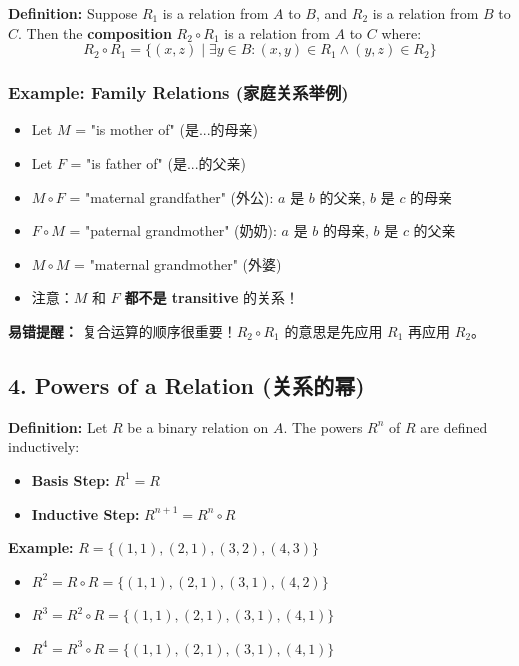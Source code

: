 \documentclass[10pt,a4paper,openany]{ctexbook}
\theoremstyle{definition}
\theoremstyle{remark}
\renewenvironment{quote}
  {\list{}{\leftmargin=1em\rightmargin=0pt\topsep=0.5pt\partopsep=0pt}\item[]}
  {\endlist}
\begin{document}
\textbf{Definition:} Suppose $R_1$ is a relation from $A$ to $B$, and $R_2$ is a relation from $B$ to $C$. Then the \textbf{composition} $R_2 \circ R_1$ is a relation from $A$ to $C$ where:
\[
R_2 \circ R_1 = \{(x,z) \mid \exists y \in B: (x,y) \in R_1 \land (y,z) \in R_2\}
\]

\subsubsection{Example: Family Relations (家庭关系举例)}

\begin{itemize}
\item Let $M$ = "is mother of" (是...的母亲)
\item Let $F$ = "is father of" (是...的父亲)
\item $M \circ F$ = "maternal grandfather" (外公): $a$ 是 $b$ 的父亲, $b$ 是 $c$ 的母亲
\item $F \circ M$ = "paternal grandmother" (奶奶): $a$ 是 $b$ 的母亲, $b$ 是 $c$ 的父亲
\item $M \circ M$ = "maternal grandmother" (外婆)
\item 注意：$M$ 和 $F$ \textbf{都不是 transitive} 的关系！

\end{itemize}

\begin{quote}
\textbf{易错提醒：} 复合运算的顺序很重要！$R_2 \circ R_1$ 的意思是先应用 $R_1$ 再应用 $R_2$。

\end{quote}
\vspace{-2pt}

\subsection{4. Powers of a Relation (关系的幂)}

\textbf{Definition:} Let $R$ be a binary relation on $A$. The powers $R^n$ of $R$ are defined inductively:
\begin{itemize}
\item \textbf{Basis Step:} $R^1 = R$
\item \textbf{Inductive Step:} $R^{n+1} = R^n \circ R$

\end{itemize}

\textbf{Example:} $R = \{(1,1), (2,1), (3,2), (4,3)\}$
\begin{itemize}
\item $R^2 = R \circ R = \{(1,1), (2,1), (3,1), (4,2)\}$
\item $R^3 = R^2 \circ R = \{(1,1), (2,1), (3,1), (4,1)\}$
\item $R^4 = R^3 \circ R = \{(1,1), (2,1), (3,1), (4,1)\}$

\end{itemize}
\end{document}
